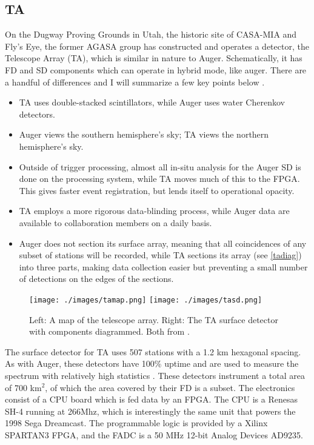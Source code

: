 \subsection{TA}
\label{ta}
On the Dugway Proving Grounds in Utah, the historic site of CASA-MIA and Fly's Eye, the former AGASA group has constructed and operates a detector, the Telescope Array (TA), which is similar in nature to Auger. Schematically, it has FD and SD components which can operate in hybrid mode, like auger. There are a handful of differences and I will summarize a few key points below \cite{tale}.
\begin{itemize}
\item TA uses double-stacked scintillators, while Auger uses water Cherenkov detectors.
\item Auger views the southern hemisphere's sky; TA views the northern hemisphere's sky.
\item Outside of trigger processing, almost all in-situ analysis for the Auger SD is done on the processing system, while TA moves much of this to the FPGA. This gives faster event registration, but lends itself to operational opacity.
\item TA employs a more rigorous data-blinding process, while Auger data are available to collaboration members on a daily basis.
\item Auger does not section its surface array, meaning that all coincidences of any subset of stations will be recorded, while TA sections its array (see \autoref{tadiag}) into three parts, making data collection easier but preventing a small number of detections on the edges of the sections.
\end{itemize}
\begin{figure}[h!]
\begin{center}
\texttt{[image: ./images/tamap.png]}
\texttt{[image: ./images/tasd.png]}
\caption[TA Map and Surface Detector]{Left: A map of the telescope array. Right: The TA surface detector with components diagrammed. Both from \cite{tasd}.}
\label{tadiag}
\end{center}
\end{figure}
The surface detector for TA uses 507 stations with a 1.2 km hexagonal spacing. As with Auger, these detectors have 100\% uptime and are used to measure the spectrum with relatively high statistics \cite{tasd}. These detectors instrument a total area of 700 km$^2$, of which the area covered by their FD is a subset. The electronics consist of a CPU board which is fed data by an FPGA. The CPU is a Renesas SH-4 running at 266Mhz, which is interestingly the same unit that powers the 1998 Sega Dreamcast. The programmable logic is provided by a Xilinx SPARTAN3 FPGA, and the FADC is a 50 MHz 12-bit Analog Devices AD9235.


